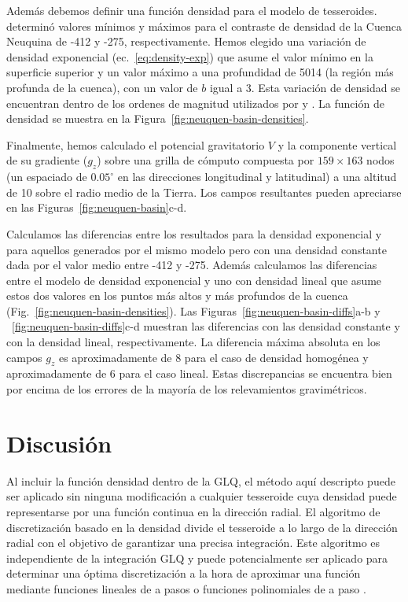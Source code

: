 Además debemos definir una función densidad para el modelo de tesseroides.
\citet{sigismondi2012} determinó valores mínimos y máximos para el contraste de
densidad de la Cuenca Neuquina de -412\kgpercubicm{} y -275\kgpercubicm{},
respectivamente.
Hemos elegido una variación de densidad exponencial (ec.~\ref{eq:density-exp})
que asume el valor mínimo en la superficie superior y un valor máximo a una
profundidad de 5014\m{} (la región más profunda de la cuenca), con un valor de
$b$ igual a 3.
Esta variación de densidad se encuentran dentro de los ordenes de magnitud
utilizados por \citet{cowie1990} y \citet{cordell1973}.
La función de densidad se muestra en la
Figura~\ref{fig:neuquen-basin-densities}.

Finalmente, hemos calculado el potencial gravitatorio $V$ y la componente
vertical de su gradiente ($g_z$) sobre una grilla de cómputo compuesta por
$159\times163$ nodos (un espaciado de $0.05^\circ$ en las direcciones
longitudinal y latitudinal) a una altitud de 10\km{} sobre el radio medio de la
Tierra.
Los campos resultantes pueden apreciarse en las
Figuras~\ref{fig:neuquen-basin}c-d.

Calculamos las diferencias entre los resultados para la densidad exponencial
y para aquellos generados por el mismo modelo pero con una densidad constante
dada por el valor medio entre -412\kgpercubicm{} y -275\kgpercubicm{}.
Además calculamos las diferencias entre el modelo de densidad exponencial y uno
con densidad lineal que asume estos dos valores en los puntos más altos y más
profundos de la cuenca (Fig.~\ref{fig:neuquen-basin-densities}).
Las Figuras~\ref{fig:neuquen-basin-diffs}a-b
y ~\ref{fig:neuquen-basin-diffs}c-d muestran las diferencias con las densidad
constante y con la densidad lineal, respectivamente.
La diferencia máxima absoluta en los campos $g_z$ es aproximadamente de
8\mGal{} para el caso de densidad homogénea y aproximadamente de 6\mGal{} para
el caso lineal.
Estas discrepancias se encuentra bien por encima de los errores de la mayoría
de los relevamientos gravimétricos.



\section{Discusión}

Al incluir la función densidad dentro de la \ac{GLQ}, el método aquí descripto
puede ser aplicado sin ninguna modificación a cualquier tesseroide cuya
densidad puede representarse por una función continua en la dirección radial.
El algoritmo de discretización basado en la densidad divide el tesseroide a lo
largo de la dirección radial con el objetivo de garantizar una precisa
integración.
Este algoritmo es independiente de la integración \ac{GLQ} y puede
potencialmente ser aplicado para determinar una óptima discretización a la hora
de aproximar una función mediante funciones lineales de a pasos \citep{lin2019}
o funciones polinomiales de a paso \citep{fukushima2018}.

